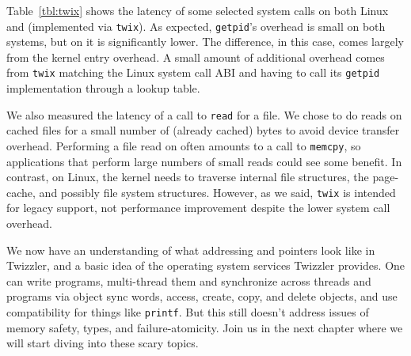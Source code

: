 Table~\ref{tbl:twix} shows the latency of some selected system calls on both Linux and \Twizzler
(implemented via \texttt{twix}). As expected, \texttt{getpid}'s overhead is small on both systems,
but on \Twizzler it is significantly lower. The difference, in this case, comes largely from the
kernel entry overhead. A small amount of additional overhead comes from
\texttt{twix} matching the Linux system call ABI and having to call its \texttt{getpid}
implementation through a lookup table.

We also measured the latency of a call to \texttt{read} for a file. We chose to do reads on cached
files for a small number of (already cached) bytes to avoid device transfer overhead. Performing a file read on
\Twizzler often amounts to a call to \texttt{memcpy}, so applications that perform large numbers of
small reads could see some benefit. In contrast, on Linux, the kernel needs to traverse internal
file structures, the page-cache, and possibly file system structures.
However, as we said, \texttt{twix} is intended for legacy
support, not performance improvement despite the lower system call overhead.

\begin{chconc}
    We now have an understanding of what addressing and pointers look like in Twizzler, and a basic idea of the
    operating system services Twizzler provides. One can write programs, multi-thread them and synchronize across
    threads and programs via object sync words, access, create, copy, and
    delete objects, and use \unix compatibility for things like \texttt{printf}. But this still doesn't address issues
    of memory safety, types, and failure-atomicity. Join us in the next chapter where we will start diving into these
    scary topics.
\end{chconc}
